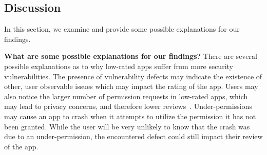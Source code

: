 \documentclass{sig-alternate-05-2015}
\begin{document}





\subsection{Discussion}




In this section, we examine and provide some possible explanations for our findings.




\textbf{What are some possible explanations for our findings?} There are several possible explanations as to why low-rated apps suffer from more security vulnerabilities. The presence of vulnerability defects may indicate the existence of other, user observable issues which may impact the rating of the app. Users may also notice the larger number of permission requests in low-rated apps, which may lead to privacy concerns, and therefore lower reviews~\cite{Lin:2012:EPU:2370216.2370290}. Under-permissions may cause an app to crash when it attempts to utilize the permission it has not been granted. While the user will be very unlikely to know that the crash was due to an under-permission, the encountered defect could still impact their review of the app.
\end{document}
